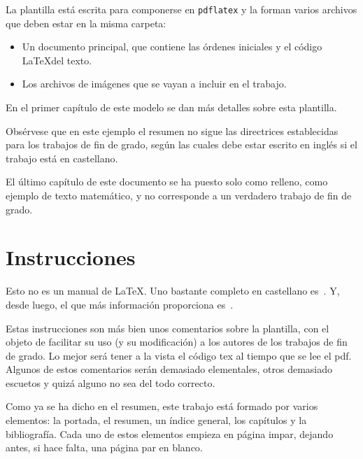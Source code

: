 \documentclass[11pt]{book}
\newcommand{\clearemptydoublepage}{\newpage{\pagestyle{empty}\cleardoublepage}}
\theoremstyle{plain} %
\theoremstyle{definition} %
\begin{document}
La plantilla está escrita para componerse en \texttt{pdflatex} y la forman varios 
archivos que deben estar en la misma carpeta:
\begin{itemize}
\item Un documento principal, que contiene las órdenes iniciales y el código \LaTeX del texto.
\item Los archivos de imágenes que se vayan a incluir en el trabajo.
\end{itemize}

En el primer capítulo de este modelo se dan más detalles sobre esta plantilla.

Obsérvese que en este ejemplo el resumen no sigue las directrices 
establecidas para los trabajos de fin de grado, según las cuales debe estar 
escrito en inglés si el trabajo está en castellano.

El último capítulo de este documento se ha puesto solo como relleno, como ejemplo 
de texto matemático, y no corresponde a un verdadero trabajo de fin de grado.


\clearemptydoublepage

\tableofcontents

\clearemptydoublepage

\mainmatter                      %
\pagestyle{miestilo}    %

\chapter{Instrucciones}

Esto no es un manual de {\LaTeX}. Uno bastante completo 
en castellano es~\cite{CLMPS}. Y, desde luego, el que más información proporciona 
es~\cite{MGBCR}.

Estas instrucciones son más bien unos comentarios sobre la plantilla, con el 
objeto de facilitar su uso (y su modificación) a los autores de los trabajos de 
fin de grado. Lo mejor será tener a la vista el código tex al tiempo que se lee 
el pdf. Algunos de estos comentarios serán demasiado elementales, otros demasiado 
escuetos y quizá alguno no sea del todo correcto.

Como ya se ha dicho en el resumen, este trabajo está formado por varios 
elementos: la portada, el 
resumen, un índice general, 
los capítulos y la bibliografía. Cada uno de 
estos elementos empieza en página impar, dejando antes, si hace falta, una página 
par en blanco.
\end{document}
